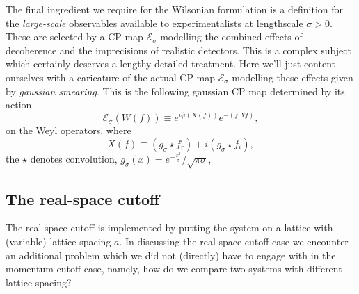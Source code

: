 \documentclass[11pt]{amsart}
\theoremstyle{plain}%
\theoremstyle{definition}
\theoremstyle{remark}
\begin{document}
The final ingredient we require for the Wilsonian formulation is a definition for the \emph{large-scale} observables available to experimentalists at lengthscale $\sigma > 0$. These are selected by a CP map $\mathcal{E}_\sigma$ modelling the combined effects of decoherence and the imprecisions of realistic detectors. This is a complex subject which certainly deserves a lengthy detailed treatment. Here we'll just content ourselves with a caricature of the actual CP map $\mathcal{E}_\sigma$ modelling these effects given by \emph{gaussian smearing}. This is the following gaussian CP map determined by its action 
\begin{equation}
	\mathcal{E}_\sigma(W(f)) \equiv e^{i\widehat{\varphi}(X(f))}e^{-(f,Yf)},
\end{equation}
on the Weyl operators, where
\begin{equation}
	X(f) \equiv (g_\sigma \star f_r) + i (g_\sigma \star f_i),
\end{equation}
the $\star$ denotes convolution, $g_\sigma(x) = e^{-\frac{x^2}{\sigma}}/\sqrt{\pi\sigma}$, 


\subsection{The real-space cutoff}
The real-space cutoff is implemented by putting the system on a lattice with (variable) lattice spacing $a$. In discussing the real-space cutoff case we encounter an additional problem which we did not (directly) have to engage with in the momentum cutoff case, namely, how do we compare two systems with different lattice spacing? 
\end{document}
